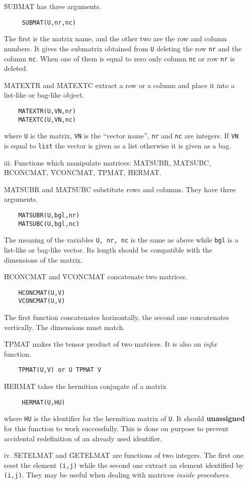 \begin{itemize}
\f{SUBMAT} has three arguments.
\begin{verbatim}
	 SUBMAT(U,nr,nc)
\end{verbatim}
The first is the matrix name, and the other two are the row and column
numbers.  It gives the submatrix obtained from \verb+U+ deleting the
row \verb+nr+ and the column \verb+nc+.  When one of them is equal to
zero only column \verb+nc+ or row \verb+nr+ is deleted.

\f{MATEXTR} and \f{MATEXTC} extract a row or a column and place it into
a list-like or bag-like object.
\begin{verbatim}
	MATEXTR(U,VN,nr)
	MATEXTC(U,VN,nc)
\end{verbatim}
where \verb+U+ is the matrix,  \verb+VN+ is the ``vector name'',
\verb+nr+  and \verb+nc+ are integers.  If \verb+VN+  is equal
to {\tt list} the vector  is given  as a list otherwise  it is
given as a bag.
\item[iii.]
Functions which manipulate matrices: \f{MATSUBR},
\f{MATSUBC}, \f{HCONCMAT},
\f{VCONCMAT}, \f{TPMAT},
\f{HERMAT}.

\f{MATSUBR} and \f{MATSUBC} substitute rows and columns. They have
three arguments.
\begin{verbatim}
	MATSUBR(U,bgl,nr)
	MATSUBC(U,bgl,nc)
\end{verbatim}
The meaning of the variables \verb+U, nr, nc+ is the same as above
while \verb+bgl+ is a list-like or bag-like vector.
Its  length should be compatible with the dimensions of the matrix.

\f{HCONCMAT} and \f{VCONCMAT} concatenate two matrices.
\begin{verbatim}
	HCONCMAT(U,V)
	VCONCMAT(U,V)
\end{verbatim}
The first function concatenates horizontally, the second one
concatenates vertically. The dimensions must match.

\f{TPMAT} makes the tensor product of two matrices. It is also an
{\em infix} function.
\begin{verbatim}
	TPMAT(U,V) or U TPMAT V
\end{verbatim}
\f{HERMAT} takes the hermitian conjugate of a matrix
\begin{verbatim}
	 HERMAT(U,HU)
\end{verbatim}
where \verb+HU+ is the identifier for the hermitian matrix of
\verb+U+.  It should {\bf unassigned} for this function to work
successfully.  This is done on purpose to prevent accidental
redefinition of an already used identifier.
\item[iv.]
\f{SETELMAT} and \f{GETELMAT} are functions of two integers. The first
one reset the element \verb+(i,j)+ while the second one extract an
element identified by \verb+(i,j)+. They may be useful when
dealing with matrices {\em inside procedures}.
\end{itemize}

